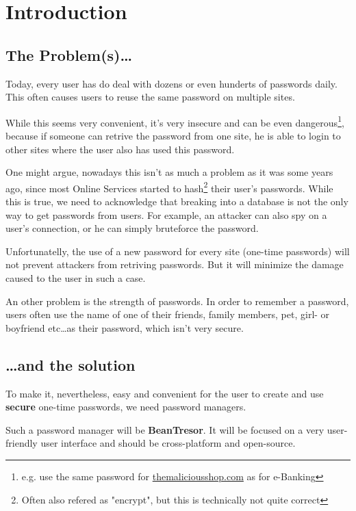 \documentclass[11pt,a4paper,titlepage,portrait,english,final]{scrartcl}
\title{\docTitle}
\subtitle{\docSubtitle}
\author{\large\scshape \docAuthor \\ \large\scshape\textbf{\href{http://kije.ch}{kije-dev}}}
\date{\normalsize\scshape\docDate}
\begin{document}
\maketitle
\newpage
\tableofcontents
\newpage

\section{Introduction}
\subsection*{The Problem(s)\ldots}
Today, every user has do deal with dozens or even hunderts of passwords daily.
This often causes users to reuse the same password on multiple sites. 

While this seems very convenient, it's very insecure and can be even dangerous\footnote{e.g. use the same password for \url{themaliciousshop.com} as for e-Banking}, because if someone can retrive the password from one site, he is able to login to other sites where the user also has used this password. 

One might argue, nowadays this isn't as much a problem as it was some years ago, since most Online Services started to hash\footnote{Often also refered as "encrypt", but this is technically not quite correct} their user's passwords. While this is true, we need to acknowledge that breaking into a database is not the only way to get passwords from users. For example, an attacker can also spy on a user's connection, or he can simply bruteforce the password.

Unfortunatelly, the use of a new password for every site (one-time passwords) will not prevent attackers from retriving passwords. But it will minimize the damage caused to the user in such a case.

An other problem is the strength of passwords. In order to remember a password, users often use the name of one of their friends, family members, pet, girl- or boyfriend etc\ldots as their password, which isn't very secure.

\subsection*{\ldots and the solution}
To make it, nevertheless, easy and convenient for the user to create and use \textbf{secure} one-time passwords, we need password managers.

Such a password manager will be \textbf{BeanTresor}. It will be focused on a very user-friendly user interface and should be cross-platform and open-source.
\end{document}
